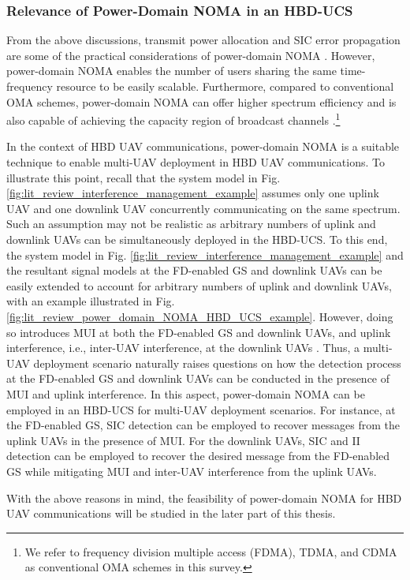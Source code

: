 \subsubsection{Relevance of Power-Domain NOMA in an HBD-UCS}

From the above discussions, transmit power allocation and SIC error propagation are some of the practical considerations of power-domain NOMA \cite{islam2017power,dai2018survey}. However, power-domain NOMA enables the number of users sharing the same time-frequency resource to be easily scalable. Furthermore, compared to conventional OMA schemes, power-domain NOMA can offer higher spectrum efficiency and is also capable of achieving the capacity region of broadcast channels \cite{dai2018survey}.\footnote{We refer to frequency division multiple access (FDMA), TDMA, and CDMA as conventional OMA schemes in this survey.}

In the context of HBD UAV communications, power-domain NOMA is a suitable technique to enable multi-UAV deployment in HBD UAV communications. To illustrate this point, recall that the system model in Fig. \ref{fig:lit_review_interference_management_example} assumes only one uplink UAV and one downlink UAV concurrently communicating on the same spectrum. Such an assumption may not be realistic as arbitrary numbers of uplink and downlink UAVs can be simultaneously deployed in the HBD-UCS. To this end, the system model in Fig. \ref{fig:lit_review_interference_management_example} and the resultant signal models at the FD-enabled GS and downlink UAVs can be easily extended to account for arbitrary numbers of uplink and downlink UAVs, with an example illustrated in Fig. \ref{fig:lit_review_power_domain_NOMA_HBD_UCS_example}. However, doing so introduces MUI at both the FD-enabled GS and downlink UAVs, and uplink interference, i.e., inter-UAV interference, at the downlink UAVs \cite{ernest2019noma}. Thus, a multi-UAV deployment scenario naturally raises questions on how the detection process at the FD-enabled GS and downlink UAVs can be conducted in the presence of MUI and uplink interference. In this aspect, power-domain NOMA can be employed in an HBD-UCS for multi-UAV deployment scenarios. For instance, at the FD-enabled GS, SIC detection can be employed to recover messages from the uplink UAVs in the presence of MUI. For the downlink UAVs, SIC and II detection can be employed to recover the desired message from the FD-enabled GS while mitigating MUI and inter-UAV interference from the uplink UAVs.

With the above reasons in mind, the feasibility of power-domain NOMA for HBD UAV communications will be studied in the later part of this thesis.

